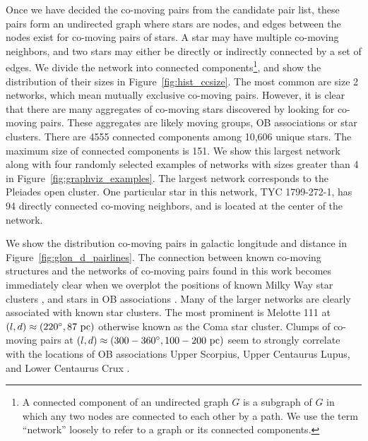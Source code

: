 \documentclass[manuscript, letterpaper]{aastex6}
\begin{document}
Once we have decided the co-moving pairs from the candidate pair list,
these pairs form an undirected graph where stars are nodes, and
edges between the nodes exist for co-moving pairs of stars.
A star may have multiple co-moving neighbors, and two stars may either
be directly or indirectly connected by a set of edges.
We divide the network into connected components\footnote{A connected component of an undirected graph $G$
is a subgraph of $G$ in which any two nodes are connected to each other by a path.
We use the term ``network'' loosely to refer to a graph or its connected components.},
and show the distribution of their sizes in Figure~\ref{fig:hist_ccsize}.
The most common are size 2 networks, which mean mutually exclusive co-moving
pairs. However, it is clear that there are many aggregates of co-moving stars
discovered by looking for co-moving pairs.
These aggregates are likely moving groups, OB associations or star clusters.
There are 4555 connected components among 10,606 unique stars.
The maximum size of connected components is 151.
We show this largest network along with four randomly selected
examples of networks with sizes greater than 4 in Figure~\ref{fig:graphviz_examples}.
The largest network corresponds to the Pleiades open cluster.
One particular star in this network, TYC 1799-272-1, has 94 directly connected
co-moving neighbors, and is located at the center of the network.

We show the distribution co-moving pairs in galactic longitude and
distance in Figure~\ref{fig:glon_d_pairlines}.
The connection between known co-moving structures and the networks of co-moving
pairs found in this work becomes immediately clear when
we overplot the positions of known Milky Way star clusters \citep{Kharchenko:2016aa},
and stars in OB associations \citep{de-Zeeuw:1999aa}.
Many of the larger networks are clearly associated with known star clusters.
The most prominent is Melotte 111 at
$(l,d)\approx (220\mbox{$^\circ$}, 87~\textrm{pc})$ otherwise known as the Coma star cluster.
Clumps of co-moving pairs at $(l,d)\approx (300-360\mbox{$^\circ$}, 100-200~\textrm{pc})$
seem to strongly correlate with the locations of OB associations
Upper Scorpius, Upper Centaurus Lupus, and Lower Centaurus Crux
\citep{de-Zeeuw:1999aa}.
\end{document}
